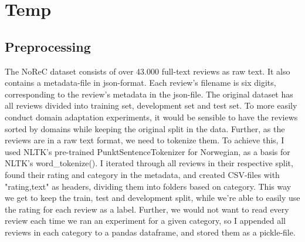 \chapter{Temp}
\label{sec:lab}
\section{Preprocessing}
The NoReC dataset consists of over 43.000 full-text reviews as raw text. It also contains a metadata-file in json-format. Each review's filename is six digits, corresponding to the review's metadata in the json-file. The original dataset has all reviews divided into training set, development set and test set. To more easily conduct domain adaptation experiments, it would be sensible to have the reviews sorted by domains while keeping the original split in the data. Further, as the reviews are in a raw text format, we need to tokenize them. To achieve this, I used NLTK's pre-trained PunktSentenceTokenizer for Norwegian, as a basis for NLTK's word\_tokenize(). I iterated through all reviews in their respective split, found their rating and category in the metadata, and created CSV-files with "rating,text" as headers, dividing them into folders based on category. This way we get to keep the train, test and development split, while we're able to easily use the rating for each review as a label. Further, we would not want to read every review each time we ran an experiment for a given category, so I appended all reviews in each category to a pandas dataframe, and stored them as a pickle-file.

